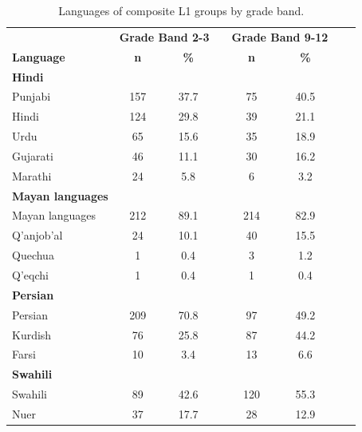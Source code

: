 \documentclass [PhD] {uclathes}
\begin{document}
\begin{table}[htbp]
\centering
\caption{\label{lang_grp} Languages of composite L1 groups by grade band.}
\scriptsize  %
\begin{tabular}{lccccccc}
\toprule
    & \multicolumn{2}{c}{\textbf{Grade Band 2-3}} & \multicolumn{1}{c}{ } & \multicolumn{2}{c}{\textbf{Grade Band 9-12}} \\
    \cline{2-3}
    \cline{5-6}
     \textbf{Language} & \textbf{n} & \textbf{\%} & & \textbf{n} & \textbf{\%} \\
    \midrule
\textbf{Hindi} & & & & & \\
\hspace{3mm} Punjabi & 157 & 37.7 & & 75 & 40.5 \\
\hspace{3mm} Hindi & 124 & 29.8 & & 39 & 21.1 \\
\hspace{3mm} Urdu & 65 & 15.6 & & 35 & 18.9 \\
\hspace{3mm} Gujarati & 46 & 11.1 & & 30 & 16.2 \\
\hspace{3mm} Marathi & 24 & 5.8 & & 6 & 3.2 \\
\textbf{Mayan languages} & & & & & \\
\hspace{3mm} Mayan languages & 212 & 89.1 & & 214 & 82.9 \\
\hspace{3mm} Q’anjob’al & 24 & 10.1 & & 40 & 15.5 \\
\hspace{3mm} Quechua & 1 & 0.4 & & 3 & 1.2 \\
\hspace{3mm} Q’eqchi & 1 & 0.4 & & 1 & 0.4 \\
\textbf{Persian} & & & & & \\
\hspace{3mm} Persian & 209 & 70.8 & & 97 & 49.2 \\
\hspace{3mm} Kurdish & 76 & 25.8 & & 87 & 44.2 \\
\hspace{3mm} Farsi & 10 & 3.4 & & 13 & 6.6 \\
\textbf{Swahili} & & & & & \\
\hspace{3mm} Swahili & 89 & 42.6 & & 120 & 55.3 \\
\hspace{3mm} Nuer & 37 & 17.7 & & 28 & 12.9 \\

\end{tabular}
\end{table}
\end{document}
